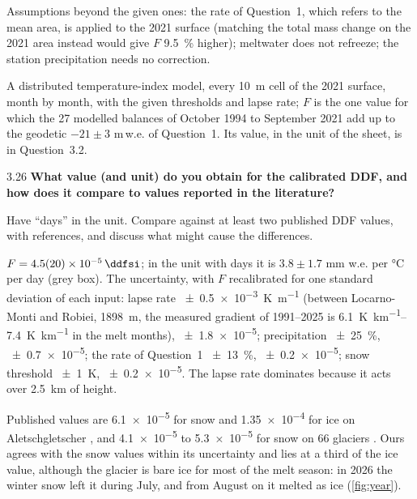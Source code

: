 \documentclass{scrartcl}
\renewcommand\unv[1]{#1}%
\begin{document}
\begin{reportpart}
{Assumptions beyond the given ones: the rate of Question~1, which refers to the mean area, is
applied to the 2021 surface (matching the total mass change on the 2021 area instead would
give $F$ \qty{9.5}{\percent} higher); meltwater does not refreeze; the station precipitation
needs no correction.

\begin{converted}
A distributed temperature-index model, every \qty{10}{\metre} cell of the 2021 surface, month
by month, with the given thresholds and lapse rate; $F$ is the one value for which the 27
modelled balances of October 1994 to September 2021 add up to the geodetic $-21 \pm 3$ m\,w.e.
of Question~1. Its value, in the unit of the sheet, is in Question~3.2.
\end{converted}}

\begin{question}{3.2}{6}\label{q:32}
\textbf{What value (and unit) do you obtain for the calibrated DDF, and how does it compare to
values reported in the literature?}

Have \enquote{days} in the unit. Compare against at least two published DDF values, with
references, and discuss what might cause the differences.
\end{question}

\unv{$F = \qty{4.5 \pm 2.0 e-5}{\ddfsi}$; in the unit with days it is $3.8 \pm 1.7$ mm w.e. per
\unit{\degreeCelsius} per day (grey box). The uncertainty, with $F$ recalibrated for one
standard deviation of each input: lapse rate \qty{\pm 0.5e-3}{\kelvin\per\metre} (between
Locarno\mbox{-}Monti and Robiei, \qty{1898}{\metre}, the measured gradient of 1991--2025 is
\qtyrange{6.1}{7.4}{\kelvin\per\kilo\metre} in the melt months), \qty{\pm 1.8e-5}{};
precipitation \qty{\pm 25}{\percent}, \qty{\pm 0.7e-5}{}; the rate of Question~1
\qty{\pm 13}{\percent}, \qty{\pm 0.2e-5}{}; snow threshold \qty{\pm 1}{\kelvin},
\qty{\pm 0.2e-5}{\ddfsi}. The lapse rate dominates because it acts over \qty{2.5}{\kilo\metre}
of height.

Published values are \qty{6.1e-5}{} for snow and \qty{1.35e-4}{\ddfsi} for ice on
Aletschgletscher \parencite{Hock2003}, and \qty{4.1e-5}{} to \qty{5.3e-5}{\ddfsi} for snow on
66 glaciers \parencite{Braithwaite2008}. Ours agrees with the snow values within its
uncertainty and lies at a third of the ice value, although the glacier is bare ice for most of
the melt season: in 2026 the winter snow left it during July, and from August on it melted as
ice (\cref{fig:year}).

}
\end{reportpart}
\end{document}
